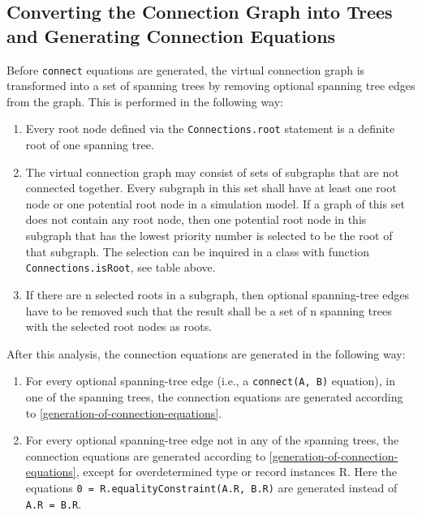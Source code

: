 \subsection{Converting the Connection Graph into Trees and Generating Connection Equations}

Before \lstinline!connect! equations are generated, the virtual connection
graph is transformed into a set of spanning trees by removing optional spanning tree edges
from the graph. This is performed in the following way:
\begin{enumerate}
\item
  Every root node defined via the \lstinline!Connections.root! statement is
  a definite root of one spanning tree.
\item
  The virtual connection graph may consist of sets of subgraphs that are
  not connected together. Every subgraph in this set shall have at least
  one root node or one potential root node in a simulation model. If a
  graph of this set does not contain any root node, then one potential
  root node in this subgraph that has the lowest priority number is
  selected to be the root of that subgraph. The selection can be
  inquired in a class with function \lstinline!Connections.isRoot!, see table
  above.
\item
  If there are n selected roots in a subgraph, then optional spanning-tree edges
  have to be removed such that the result shall be a set of n spanning
  trees with the selected root nodes as roots.
\end{enumerate}

After this analysis, the connection equations are generated in the
following way:
\begin{enumerate}
\item
  For every optional spanning-tree edge (i.e., a \lstinline!connect(A, B)!
  equation), in one of the spanning trees, the connection
  equations are generated according to \autoref{generation-of-connection-equations}.
\item
  For every optional spanning-tree edge not in any of the spanning trees, the
  connection equations are generated according to \autoref{generation-of-connection-equations}, except
  for overdetermined type or record instances R. Here the equations
  \lstinline!0 = R.equalityConstraint(A.R, B.R)! are generated instead
  of \lstinline!A.R = B.R!.
\end{enumerate}

